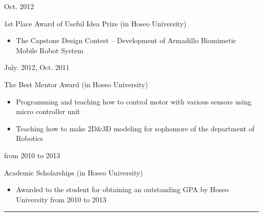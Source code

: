 \documentclass[a4paper,10pt]{article}
\newlength{\cvcolumngapwidth}
\newlength{\cvleftcolumnwidth}
\newlength{\cvrightcolumnwidth}
\newcommand{\cvsectionstyle}[1]{{\normalsize\cvsectionfont\textcolor{cvsectioncolor}{#1}}}
\newcommand{\cvtitlestyle}[1]{{\large\cvtitlefont\textcolor{cvtitlecolor}{#1}}}
\newcommand{\cvheadingstyle}[1]{{\normalsize\cvheadingfont\textcolor{cvheadingcolor}{#1}}}
\newlength{\cvafteritemskipamount}
\newlength{\cvaftersectionskipamount}
\newlength{\cvbetweensectionandheadingextraskipamount}
\newlength{\cvaftertitleskipamount}
\newlength{\cvparskip}
\newcommand{\cvsection}[1]{
    \begin{minipage}[t]{\cvleftcolumnwidth}
        \raggedleft\cvsectionstyle{#1}
    \end{minipage}%
    \hspace{\cvcolumngapwidth}%
    \begin{minipage}[t]{\cvrightcolumnwidth}
        \textcolor{cvrulecolor}{\rule{\cvrightcolumnwidth}{0.3mm}}
    \end{minipage}

    \vspace{\cvaftersectionskipamount}
}
\newcommand{\cvitem}[2]{
    \begin{minipage}[t]{\cvleftcolumnwidth}
        \raggedleft #1
    \end{minipage}%
    \hspace{\cvcolumngapwidth}%
    \begin{minipage}[t]{\cvrightcolumnwidth}
        \setlength{\parskip}{\cvparskip} #2
    \end{minipage}

    \vspace{\cvafteritemskipamount}
}
\newcommand{\cvtitle}[1]{
    \cvtitlestyle{#1}

    \vspace{\cvaftertitleskipamount}
    \vspace{-\cvparskip}
}
\begin{document}
\vspace{\cvbetweensectionandheadingextraskipamount}

\cvitem{
    \cvheadingstyle{Oct. 2012}
}{
    \cvtitle{1st Place Award of Useful Idea Prize (in Hoseo University)}
    \begin{itemize}
        \item The Capstone Design Contest -- Development of Armadillo Biomimetic Mobile Robot System
       
    \end{itemize}
}
\cvitem{
    \cvheadingstyle{July. 2012, Oct. 2011}
}{
    \cvtitle{The Best Mentor Award (in Hoseo University)}
    \begin{itemize}
        \item Programming and teaching how to control motor with various sensors using micro controller unit
        \item Teaching how to make 2D\&3D modeling for sophomore of the department of Robotics
    \end{itemize}
}
\cvitem{
    \cvheadingstyle{from 2010 to 2013}
}{
    \cvtitle{Academic Scholarships (in Hoseo University)}
    \begin{itemize}
        \item Awarded to the student for obtaining an outstanding GPA by Hoseo University from 2010 to 2013
    \end{itemize}
}

\vspace*{1cm}

\cvsection{Publications}

\end{document}
